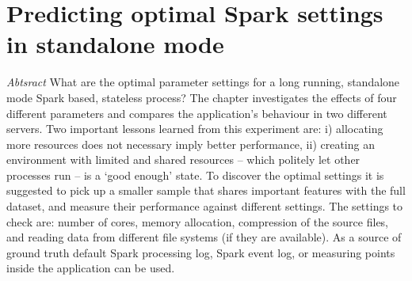\chapter{Predicting optimal Spark settings in standalone mode}

\emph{Abtsract} What are the optimal parameter settings for a long running, standalone mode Spark based, stateless process? The chapter investigates the effects of four different parameters and compares the application's behaviour in two different servers. Two important lessons learned from this experiment are: i) allocating more resources does not necessary imply better performance, ii) creating an environment with limited and shared resources -- which politely let other processes run -- is a `good enough' state. To discover the optimal settings it is suggested to pick up a smaller sample that shares important features with the full dataset, and measure their performance against different settings. The settings to check are: number of cores, memory allocation, compression of the source files, and reading data from different file systems (if they are available). As a source of ground truth default Spark processing log, Spark event log, or measuring points inside the application can be used.


